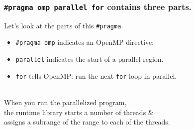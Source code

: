 \begin{frame}[containsverbatim]
  \frametitle{{\tt \#pragma omp parallel for} contains three parts.}

\begin{changemargin}{1cm}
\large
  Let's look at the parts of this \verb+#pragma+.\\[1em]

  \begin{itemize}
    \item \verb+#pragma omp+ indicates an OpenMP directive;
    \vfill
    \item {\tt parallel} indicates the start of a parallel region.
    \vfill
    \item {\tt for} tells OpenMP: run the next {\tt for} loop in parallel.
  \end{itemize}
  ~\\[-1em]

  When you run the parallelized program, \\ the runtime library starts
  a number of threads \& \\  assigns a subrange of the range to 
  each of the threads.
\end{changemargin}

\end{frame}

